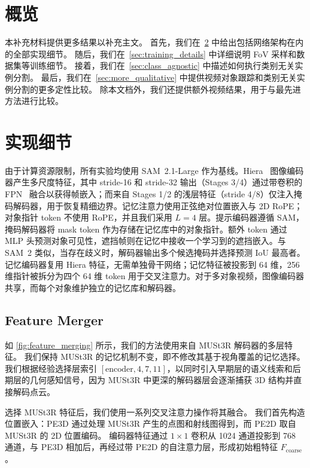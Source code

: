 \section{概览}
\label{sec:appendix_overview}
本补充材料提供更多结果以补充主文。
首先，我们在~\cref{sec:details} 中给出包括网络架构在内的全部实现细节。
随后，我们在~\cref{sec:training_details} 中详细说明 FoV 采样和数据集等训练细节。
接着，我们在~\cref{sec:class_agnostic} 中描述如何执行类别无关实例分割。
最后，我们在~\cref{sec:more_qualitative} 中提供视频对象跟踪和类别无关实例分割的更多定性比较。
除本文档外，我们还提供额外视频结果，用于与最先进方法进行比较。


\section{实现细节} \label{sec:details}
由于计算资源限制，所有实验均使用 SAM~2.1-Large 作为基线。Hiera~\cite{ryali2023hiera} 图像编码器产生多尺度特征，其中 stride-16 和 stride-32 输出（Stages 3/4）通过带卷积的 FPN~\cite{lin2017featureFPN} 融合以获得帧嵌入；而来自 Stages 1/2 的浅层特征（stride 4/8）仅注入掩码解码器，用于恢复精细边界。记忆注意力使用正弦绝对位置嵌入与 2D RoPE；对象指针 token 不使用 RoPE，并且我们采用 $L=4$ 层。提示编码器遵循 SAM，掩码解码器将 mask token 作为存储在记忆库中的对象指针。额外 token 通过 MLP 头预测对象可见性，遮挡帧则在记忆中接收一个学习到的遮挡嵌入。与 SAM~2 类似，当存在歧义时，解码器输出多个候选掩码并选择预测 IoU 最高者。记忆编码器复用 Hiera 特征，无需单独骨干网络；记忆特征被投影到 64 维，256 维指针被拆分为四个 64 维 token 用于交叉注意力。对于多对象视频，图像编码器共享，而每个对象维护独立的记忆库和解码器。
 
\subsection{Feature Merger}


如 \cref{fig:feature_merging} 所示，我们的方法使用来自 MUSt3R 解码器的多层特征。
我们保持 MUSt3R 的记忆机制不变，即不修改其基于视角覆盖的记忆选择。
我们根据经验选择层索引 $[\text{encoder}, 4, 7, 11]$，以同时引入早期层的语义线索和后期层的几何感知信号，因为 MUSt3R 中更深的解码器层会逐渐捕获 3D 结构并直接解码点云。

选择 MUSt3R 特征后，我们使用一系列交叉注意力操作将其融合。
我们首先构造位置嵌入：PE3D 通过处理 MUSt3R 产生的点图和射线图得到，而 PE2D 取自 MUSt3R 的 2D 位置编码。
编码器特征通过 $1\!\times\!1$ 卷积从 1024 通道投影到 768 通道，与 PE3D 相加后，再经过带 PE2D 的自注意力层，形成初始粗特征 $F_{\text{coarse}}$。

